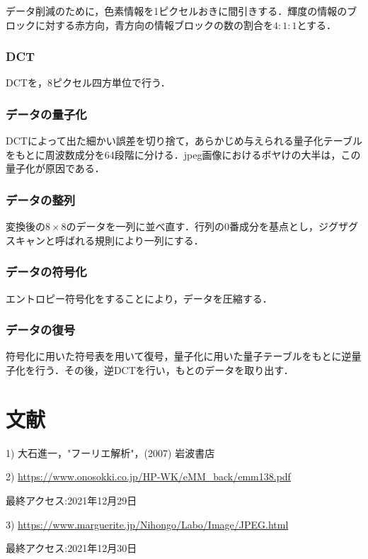 \documentclass[uplatex,dvipdfmx,ja=standard]{bxjsarticle}
\begin{document}
データ削減のために，色素情報を1ピクセルおきに間引きする．輝度の情報のブロックに対する赤方向，青方向の情報ブロックの数の割合を$4:1:1$とする．

\subsubsection{DCT}

DCTを，8ピクセル四方単位で行う．

\subsubsection{データの量子化}

DCTによって出た細かい誤差を切り捨て，あらかじめ与えられる量子化テーブルをもとに周波数成分を64段階に分ける．jpeg画像におけるボヤけの大半は，この量子化が原因である．

\subsubsection{データの整列}

変換後の$8\times 8$のデータを一列に並べ直す．行列の0番成分を基点とし，ジグザグスキャンと呼ばれる規則により一列にする．


\subsubsection{データの符号化}

エントロピー符号化をすることにより，データを圧縮する．

\subsubsection{データの復号}

符号化に用いた符号表を用いて復号，量子化に用いた量子テーブルをもとに逆量子化を行う．その後，逆DCTを行い，もとのデータを取り出す．


\section{文献}
1) 大石進一，"フーリエ解析"，(2007) 岩波書店

2) \url{https://www.onosokki.co.jp/HP-WK/eMM_back/emm138.pdf}

最終アクセス:2021年12月29日

3) \url{https://www.marguerite.jp/Nihongo/Labo/Image/JPEG.html}

最終アクセス:2021年12月30日
\end{document}
